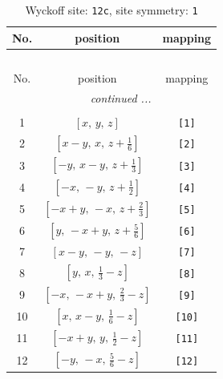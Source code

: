 \documentclass[fleqn,8pt]{jsarticle}
\begin{document}
\begin{longtable}{ccc}
\caption{Wyckoff site: {\tt 12c}, site symmetry: {\tt 1}}
 \\
 \hline \hline
No. & position & mapping \\ \hline \endfirsthead

\multicolumn{2}{l}{\tablename\ \thetable{}} \\
 \hline \hline
No. & position & mapping \\ \hline \endhead

 \hline \hline
\multicolumn{2}{r}{\footnotesize\it continued ...} \\ \endfoot

 \hline \hline
\multicolumn{2}{r}{} \\ \endlastfoot

1 & $\left[ x,\, y,\, z \right]$ & {\tt [1]} \\ \hline
2 & $\left[ x - y,\, x,\, z + \frac{1}{6} \right]$ & {\tt [2]} \\ \hline
3 & $\left[ - y,\, x - y,\, z + \frac{1}{3} \right]$ & {\tt [3]} \\ \hline
4 & $\left[ - x,\, - y,\, z + \frac{1}{2} \right]$ & {\tt [4]} \\ \hline
5 & $\left[ - x + y,\, - x,\, z + \frac{2}{3} \right]$ & {\tt [5]} \\ \hline
6 & $\left[ y,\, - x + y,\, z + \frac{5}{6} \right]$ & {\tt [6]} \\ \hline
7 & $\left[ x - y,\, - y,\, - z \right]$ & {\tt [7]} \\ \hline
8 & $\left[ y,\, x,\, \frac{1}{3} - z \right]$ & {\tt [8]} \\ \hline
9 & $\left[ - x,\, - x + y,\, \frac{2}{3} - z \right]$ & {\tt [9]} \\ \hline
10 & $\left[ x,\, x - y,\, \frac{1}{6} - z \right]$ & {\tt [10]} \\ \hline
11 & $\left[ - x + y,\, y,\, \frac{1}{2} - z \right]$ & {\tt [11]} \\ \hline
12 & $\left[ - y,\, - x,\, \frac{5}{6} - z \right]$ & {\tt [12]} \\
\end{longtable}
\end{document}
